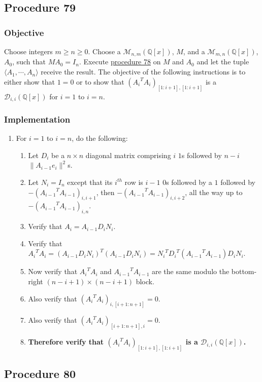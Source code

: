 \documentclass[twocolumn]{article}
\begin{document}
		\subsection{Procedure 79}\label{sec:procedure 79}
			\subsubsection{Objective}
				Choose integers $m\ge n\ge 0$. Choose a $\mathcal{M}_{n,m}(\mathbb{Q}[x])$, $M$, and a $\mathcal{M}_{m,n}(\mathbb{Q}[x])$, $A_0$, such that $MA_0=I_n$. Execute \hyperref[sec:procedure 78]{procedure 78} on $M$ and $A_0$ and let the tuple $\langle A_1,\cdots,A_n\rangle$ receive the result. The objective of the following instructions is to either show that $1=0$ or to show that $({A_i}^TA_i)_{[1:i+1],[1:i+1]}$ is a $\mathcal{D}_{i,i}(\mathbb{Q}[x])$ for $i=1$ to $i=n$.
			\subsubsection{Implementation}
				\begin{enumerate}
					\item For $i=1$ to $i=n$, do the following:
					\begin{enumerate}
						\item Let $D_i$ be a $n\times n$ diagonal matrix comprising $i$ $1$s followed by $n-i$ $\lVert A_{i-1}e_i\rVert^2$s.
						\item Let $N_i=I_n$ except that its $i^{th}$ row is $i-1$ $0$s followed by a $1$ followed by $-({A_{i-1}}^TA_{i-1})_{i,i+1}$, then $-({A_{i-1}}^TA_{i-1})_{i,i+2}$, all the way up to $-({A_{i-1}}^TA_{i-1})_{i,n}$.
						\item Verify that $A_i=A_{i-1}D_iN_i$.
						\item Verify that ${A_i}^TA_i=(A_{i-1}D_iN_i)^T(A_{i-1}D_iN_i)={N_i}^T{D_i}^T({A_{i-1}}^TA_{i-1})D_iN_i$.
						\item Now verify that ${A_i}^TA_i$ and ${A_{i-1}}^TA_{i-1}$ are the same modulo the bottom-right $(n-i+1)\times(n-i+1)$ block.
						\item Also verify that $({A_i}^TA_i)_{i,[i+1:n+1]}=0$.
						\item Also verify that $({A_i}^TA_i)_{[i+1:n+1],i}=0$.
						\item \textbf{Therefore verify that $({A_i}^TA_i)_{[1:i+1],[1:i+1]}$ is a $\mathcal{D}_{i,i}(\mathbb{Q}[x])$.}
					\end{enumerate}
				\end{enumerate}
		\subsection{Procedure 80}\label{sec:procedure 80}
\end{document}
